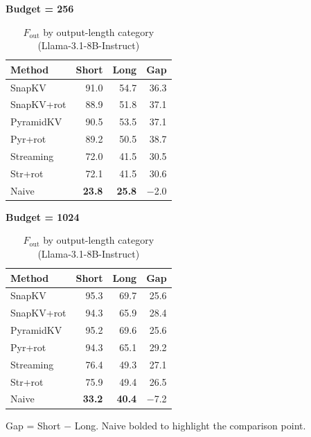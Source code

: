 \documentclass[10pt,letterpaper]{article}
\begin{document}
\begin{table}[H]
\centering
\small
\caption{\(F_{\text{out}}\) by output-length category (Llama-3.1-8B-Instruct)}
\label{tab:instruct-fout-shortlong}
\begin{minipage}[t]{0.47\textwidth}
\centering
\textbf{Budget = 256}\\[4pt]
\begin{tabular}{@{}lrrr@{}}
\toprule
Method & Short & Long & Gap\\
\midrule
SnapKV     & 91.0 & 54.7 & 36.3\\
SnapKV+rot & 88.9 & 51.8 & 37.1\\
PyramidKV  & 90.5 & 53.5 & 37.1\\
Pyr+rot    & 89.2 & 50.5 & 38.7\\
Streaming  & 72.0 & 41.5 & 30.5\\
Str+rot   & 72.1 & 41.5 & 30.6\\
Naive      & \textbf{23.8} & \textbf{25.8} & $-$2.0\\
\bottomrule
\end{tabular}
\end{minipage}
\hfill
\begin{minipage}[t]{0.47\textwidth}
\centering
\textbf{Budget = 1024}\\[4pt]
\begin{tabular}{@{}lrrr@{}}
\toprule
Method & Short & Long & Gap\\
\midrule
SnapKV     & 95.3 & 69.7 & 25.6\\
SnapKV+rot & 94.3 & 65.9 & 28.4\\
PyramidKV  & 95.2 & 69.6 & 25.6\\
Pyr+rot    & 94.3 & 65.1 & 29.2\\
Streaming  & 76.4 & 49.3 & 27.1\\
Str+rot   & 75.9 & 49.4 & 26.5\\
Naive      & \textbf{33.2} & \textbf{40.4} & $-$7.2\\
\bottomrule
\end{tabular}
\end{minipage}

\medskip
Gap = Short $-$ Long.  Naive bolded to highlight the comparison point.
\end{table}
\end{document}
